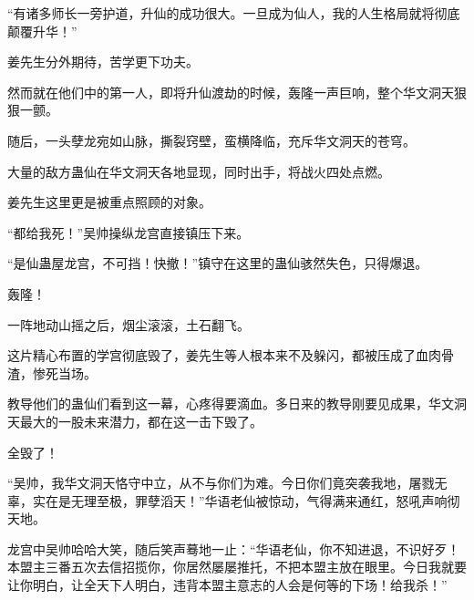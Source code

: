 \begin{this_body}
“有诸多师长一旁护道，升仙的成功很大。一旦成为仙人，我的人生格局就将彻底颠覆升华！”

姜先生分外期待，苦学更下功夫。

然而就在他们中的第一人，即将升仙渡劫的时候，轰隆一声巨响，整个华文洞天狠狠一颤。

随后，一头孽龙宛如山脉，撕裂窍壁，蛮横降临，充斥华文洞天的苍穹。

大量的敌方蛊仙在华文洞天各地显现，同时出手，将战火四处点燃。

姜先生这里更是被重点照顾的对象。

“都给我死！”吴帅操纵龙宫直接镇压下来。

“是仙蛊屋龙宫，不可挡！快撤！”镇守在这里的蛊仙骇然失色，只得爆退。

轰隆！

一阵地动山摇之后，烟尘滚滚，土石翻飞。

这片精心布置的学宫彻底毁了，姜先生等人根本来不及躲闪，都被压成了血肉骨渣，惨死当场。

教导他们的蛊仙们看到这一幕，心疼得要滴血。多日来的教导刚要见成果，华文洞天最大的一股未来潜力，都在这一击下毁了。

全毁了！

“吴帅，我华文洞天恪守中立，从不与你们为难。今日你们竟突袭我地，屠戮无辜，实在是无理至极，罪孽滔天！”华语老仙被惊动，气得满来通红，怒吼声响彻天地。

龙宫中吴帅哈哈大笑，随后笑声蓦地一止：“华语老仙，你不知进退，不识好歹！本盟主三番五次去信招揽你，你居然屡屡推托，不把本盟主放在眼里。今日我就要让你明白，让全天下人明白，违背本盟主意志的人会是何等的下场！给我杀！”

\end{this_body}


